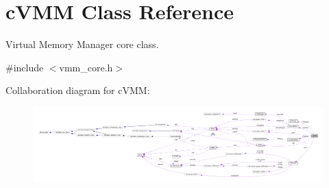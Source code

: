 \hypertarget{classcVMM}{\section{c\-V\-M\-M \-Class \-Reference}
\label{dc/de5/classcVMM}
}


\-Virtual \-Memory \-Manager core class.  




{\ttfamily \#include $<$vmm\-\_\-core.\-h$>$}



\-Collaboration diagram for c\-V\-M\-M\-:\nopagebreak
\begin{figure}[H]
\begin{center}
\leavevmode
\includegraphics[width=350pt]{de/d7e/classcVMM__coll__graph}
\end{center}
\end{figure}
